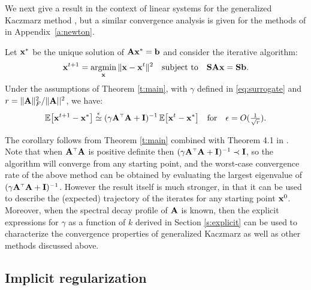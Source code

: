 \documentclass[thesis.tex]{subfiles}
\begin{document}
We next 
give a result in the context of linear systems
for the generalized Kaczmarz method \cite{generalized-kaczmarz}, but a similar
convergence analysis is given for the methods of
\cite{Gower2019,jacsketch} in Appendix~\ref{a:newton}.
\begin{corollary}\label{c:kaczmarz}
Let $\mathbf x^*$ be the unique solution of $\mathbf A\mathbf x^*=\mathbf b$ and consider
  the iterative algorithm:
  \begin{align*}
    \mathbf x^{t+1} = \operatorname*{\mathop{\mathrm{argmin}}}_\mathbf x\|\mathbf x-\mathbf x^t\|^2\quad\textnormal{subject to}\quad\mathbf{S}\mathbf A\mathbf x=\mathbf{S}\mathbf b.
  \end{align*}
Under the assumptions of Theorem \ref{t:main}, with $\gamma$ defined in
\eqref{eq:surrogate} and $r=\|\mathbf A\|_F^2/\|\mathbf A||^2$, we have:
  \begin{align*}
    \E\big[\x^{t+1}-\x^*\big] \overset\epsilon\simeq 
    (\gamma\A^\top\A+\I)^{-1}\,\E\big[\x^t-\x^*\big]
    \quad\text{for}\quad\epsilon=O(\tfrac1{\sqrt r}). 
  \end{align*}
\end{corollary}
The corollary follows from Theorem \ref{t:main} combined with Theorem
4.1 in \cite{generalized-kaczmarz}. 
Note that when $\A^\top\A$ is positive definite then
$(\gamma\A^\top\A+\I)^{-1}\prec\I$, so the algorithm will
converge from any starting point, and the worst-case convergence rate of the above method can be
obtained by evaluating the largest eigenvalue of
$(\gamma\A^\top\A+\I)^{-1}$. However the result itself is much
stronger, in that it can be used to describe the (expected) trajectory of the
iterates for any starting point $\mathbf x^0$. Moreover, when the spectral decay
profile of $\mathbf A$ is known, then the explicit expressions for $\gamma$
as a function of $k$ derived in Section \ref{s:explicit} can be used
to characterize the convergence properties of generalized Kaczmarz as
well as other methods discussed above.

\subsection{Implicit regularization}\label{s:implicit}
\end{document}
